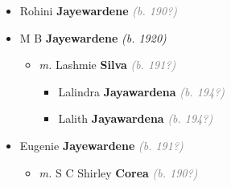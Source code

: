 \documentclass[10pt, openany]{book}
\begin{document}
\begin{itemize}
{\begin{itemize}
{\begin{itemize}
{\begin{itemize}
{\begin{itemize}
{\begin{itemize}
{    }
\end{itemize}
   }
\item{H W \textbf{Jayawardena} \textcolor{gray}{\textit{(b. 197?)}}
  }
\item{E W Married Vikki Boulton Anglo Australian \textbf{Jayawardena} \textcolor{gray}{\textit{(b. 198?)}}
\begin{itemize}
\item{E W \textbf{Jayawardena} \textcolor{gray}{\textit{(b. 201?)}}
  }
\item{T G \textbf{Jayawardena} \textcolor{gray}{\textit{(b. 201?)}}
  }
\item{H W \textbf{Jayawardena} \textcolor{gray}{\textit{(b. 202?)}}
  }
\end{itemize}
       }
\end{itemize}}
\end{itemize}
   }
\end{itemize}
  }
\item{Rohini \textbf{Jayewardene} \textcolor{gray}{\textit{(b. 190?)}}
 }
\item{M B \textbf{Jayewardene} \textcolor{slorange}{\textit{(b. 1920)}}
\begin{itemize}
\item{\textit{m.} Lashmie \textbf{Silva} \textcolor{gray}{\textit{(b. 191?)}}   \label{couple:00002594:00003485} \begin{itemize}
\item{Lalindra \textbf{Jayawardena} \textcolor{gray}{\textit{(b. 194?)}}
 }
\item{Lalith \textbf{Jayawardena} \textcolor{gray}{\textit{(b. 194?)}}
 }
\end{itemize}}
\end{itemize}
  }
\item{Eugenie \textbf{Jayewardene} \textcolor{gray}{\textit{(b. 191?)}}
\begin{itemize}
\item{\textit{m.} S C Shirley \textbf{Corea} \textcolor{gray}{\textit{(b. 190?)}}   \label{couple:00002595:00003491} \begin{itemize}

\end{itemize}}
\end{itemize}}
\end{itemize}}
\end{itemize}
\end{document}
